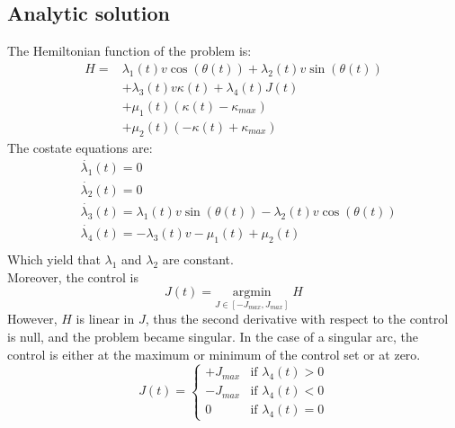 \documentclass[11pt,twocolumn]{scrartcl}
\begin{document}
\subsection*{Analytic solution}
%
The Hemiltonian function of the problem is:
%
\begin{equation}
  \begin{split}
    H = &\lambda_1(t) v \cos(\theta(t)) + \lambda_2(t) v \sin(\theta(t)) \\
        &+ \lambda_3(t) v \kappa(t) + \lambda_4(t) J(t)\\
        &+ \mu_1(t) (\kappa(t)-\kappa_{max}) \\ 
        &+ \mu_2(t) (-\kappa(t)+\kappa_{max})
  \end{split}
\end{equation}
%
The costate equations are:
%
\begin{equation}
  \begin{split}
    &\dot{\lambda_1}(t) = 0 \\
    &\dot{\lambda_2}(t) = 0 \\
    &\dot{\lambda_3}(t) = \lambda_1(t) v \sin(\theta(t)) - \lambda_2(t) v \cos(\theta(t)) \\
    &\dot{\lambda_4}(t) = -\lambda_3(t) v -\mu_1(t) + \mu_2(t) \\
  \end{split}
\end{equation}
%
Which yield that $\lambda_1$ and $\lambda_2$ are constant.\\
Moreover, the control is
%
\begin{equation}
  J(t) = \underset{ J \in [-J_{max},J_{max}]}{ \textrm{argmin} } \; H 
\end{equation}
%
However, $H$ is linear in $J$, thus the second derivative with respect to the control is null, and the problem became singular. In the case of a singular arc, the control is either at the maximum or minimum of the control set or at zero.
%
\begin{equation}
  J(t) = \begin{cases}
    +J_{max} & \text{if } \lambda_4(t) > 0 \\
    -J_{max} & \text{if } \lambda_4(t) < 0 \\
    0 & \text{if } \lambda_4(t) = 0
  \end{cases}
\end{equation}
%
\end{document}

